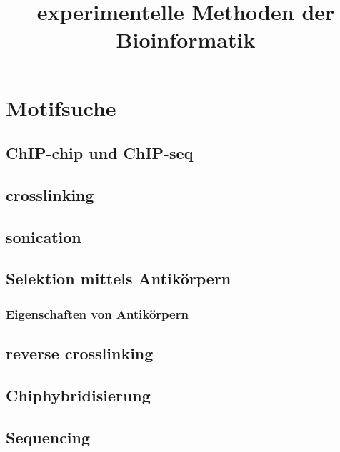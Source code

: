 \documentclass[12pt]{article}
\title{\Huge\textbf{experimentelle Methoden der Bioinformatik}}
\author{}
\date{}
\begin{document}
\begin{titlepage}

\maketitle
\thispagestyle{empty}
\end{titlepage}
\newpage

\begin{titlepage}
\tableofcontents
\thispagestyle{empty}
\end{titlepage}
\newpage

\section{Motifsuche}

\subsection{ChIP-chip und ChIP-seq}

\subsection{crosslinking}

\subsection{sonication}

\subsection{Selektion mittels Antikörpern}

\subsubsection{Eigenschaften von Antikörpern}

\subsection{reverse crosslinking}

\subsection{Chiphybridisierung}

\subsection{Sequencing}
\end{document}
